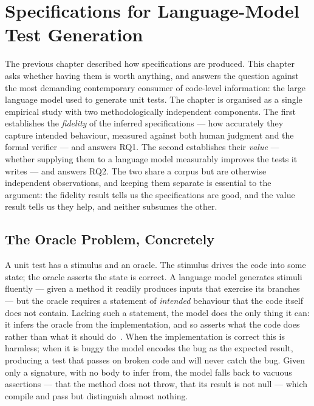 \chapter{Specifications for Language-Model Test Generation}
\label{ch:testgen}

The previous chapter described how specifications are produced. This chapter
asks whether having them is worth anything, and answers the question against
the most demanding contemporary consumer of code-level information: the large
language model used to generate unit tests. The chapter is organised as a
single empirical study with two methodologically independent components. The
first establishes the \emph{fidelity} of the inferred specifications --- how
accurately they capture intended behaviour, measured against both human
judgment and the formal verifier --- and answers RQ1. The second establishes
their \emph{value} --- whether supplying them to a language model measurably
improves the tests it writes --- and answers RQ2. The two share a corpus but
are otherwise independent observations, and keeping them separate is essential
to the argument: the fidelity result tells us the specifications are good, and
the value result tells us they help, and neither subsumes the other.

\section{The Oracle Problem, Concretely}
\label{sec:tg-oracle}

A unit test has a stimulus and an oracle. The stimulus drives the code into
some state; the oracle asserts the state is correct. A language model generates
stimuli fluently --- given a method it readily produces inputs that exercise
its branches --- but the oracle requires a statement of \emph{intended}
behaviour that the code itself does not contain. Lacking such a statement, the
model does the only thing it can: it infers the oracle from the implementation,
and so asserts what the code does rather than what it should
do~\cite{konstantinou2024oracles}. When the implementation is correct this is
harmless; when it is buggy the model encodes the bug as the expected result,
producing a test that passes on broken code and will never catch the bug. Given
only a signature, with no body to infer from, the model falls back to vacuous
assertions --- that the method does not throw, that its result is not null ---
which compile and pass but distinguish almost nothing.

